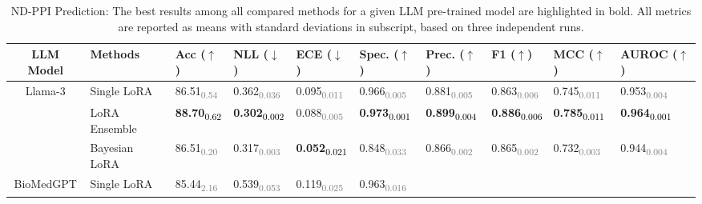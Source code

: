 \begin{table*}[htb]
\fontsize{8.75}{11}\selectfont
\centering
\caption{ND-PPI Prediction: The best results among all compared methods for a given LLM pre-trained model are highlighted in bold. All metrics are reported as means with standard deviations in subscript, based on three independent runs.}
\label{table:nd-ppi}
\begin{tabular}{c|l|*{8}{l}} %
\toprule
LLM Model & Methods & Acc ($\uparrow$) & NLL ($\downarrow$) & ECE ($\downarrow$) & Spec. ($\uparrow$) & Prec. ($\uparrow$) & F1 ($\uparrow$) & MCC ($\uparrow$) & AUROC ($\uparrow$) \\
\midrule
\multirow{3}{*}{Llama-3} & Single LoRA & 
86.51\textsubscript{\textcolor{gray}{0.54}} & 0.362\textsubscript{\textcolor{gray}{0.036}} & 0.095\textsubscript{\textcolor{gray}{0.011}} & 0.966\textsubscript{\textcolor{gray}{0.005}} & 0.881\textsubscript{\textcolor{gray}{0.005}} & 0.863\textsubscript{\textcolor{gray}{0.006}} & 0.745\textsubscript{\textcolor{gray}{0.011}} & 0.953\textsubscript{\textcolor{gray}{0.004}} \\
& LoRA Ensemble & 
\textbf{88.70}\textsubscript{\textcolor{black}{0.62}} & \textbf{0.302}\textsubscript{\textcolor{black}{0.002}} & 0.088\textsubscript{\textcolor{gray}{0.005}} & \textbf{0.973}\textsubscript{\textcolor{black}{0.001}} & \textbf{0.899}\textsubscript{\textcolor{black}{0.004}} & \textbf{0.886}\textsubscript{\textcolor{black}{0.006}} & \textbf{0.785}\textsubscript{\textcolor{black}{0.011}} & \textbf{0.964}\textsubscript{\textcolor{black}{0.001}} \\ 
& Bayesian LoRA & 
86.51\textsubscript{\textcolor{gray}{0.20}} & 0.317\textsubscript{\textcolor{gray}{0.003}} & 
\textbf{0.052}\textsubscript{\textcolor{black}{0.021}} & 0.848\textsubscript{\textcolor{gray}{0.033}} & 
0.866\textsubscript{\textcolor{gray}{0.002}} & 0.865\textsubscript{\textcolor{gray}{0.002}} & 
0.732\textsubscript{\textcolor{gray}{0.003}} & 0.944\textsubscript{\textcolor{gray}{0.004}} \\
\midrule
\multirow{3}{*}{BioMedGPT} & Single LoRA & 
85.44\textsubscript{\textcolor{gray}{2.16}} & 0.539\textsubscript{\textcolor{gray}{0.053}} & 
0.119\textsubscript{\textcolor{gray}{0.025}} & 0.963\textsubscript{\textcolor{gray}{0.016}} & 

\end{tabular}
\end{table*}
